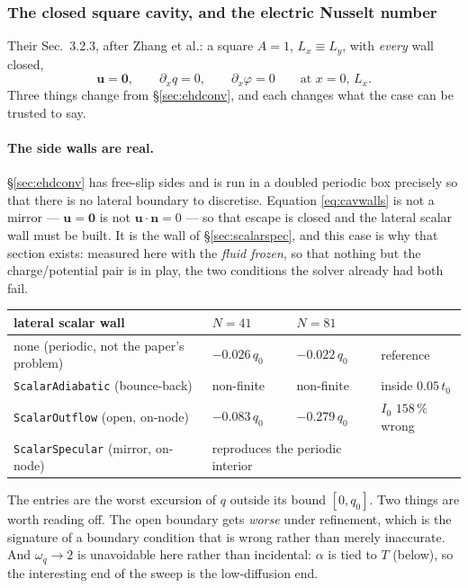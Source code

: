 \documentclass[11pt,a4paper]{article}
\newcommand{\code}[1]{\texttt{\small #1}}
\newcommand{\uu}{\bm{u}}
\newcommand{\nn}{\bm{n}}
\begin{document}
\subsubsection{The closed square cavity, and the electric Nusselt number}
\label{sec:ehdcavity}

Their Sec.~3.2.3, after Zhang et al.: a square $A=1$, $L_x\equiv L_y$, with
\emph{every} wall closed,
\begin{equation}
  \uu = \bm 0,\qquad \partial_x q = 0,\qquad \partial_x\varphi = 0
  \qquad\text{at } x = 0,\,L_x .
  \label{eq:cavwalls}
\end{equation}
Three things change from \S\ref{sec:ehdconv}, and each changes what the case can
be trusted to say.

\paragraph{The side walls are real.} \S\ref{sec:ehdconv} has free-slip sides and
is run in a doubled periodic box precisely so that there is no lateral boundary
to discretise. Equation \eqref{eq:cavwalls} is not a mirror --- $\uu=\bm 0$ is
not $\uu\!\cdot\!\nn=0$ --- so that escape is closed and the lateral scalar wall
must be built. It is the wall of \S\ref{sec:scalarspec}, and this case is why
that section exists: measured here with the \emph{fluid frozen}, so that nothing
but the charge/potential pair is in play, the two conditions the solver already
had both fail.

\begin{center}
\begin{tabular}{llll}
\hline
lateral scalar wall & $N=41$ & $N=81$ & \\
\hline
none (periodic, not the paper's problem) & $-0.026\,q_0$ & $-0.022\,q_0$ & reference \\
\code{ScalarAdiabatic} (bounce-back)     & non-finite    & non-finite    & inside $0.05\,t_0$ \\
\code{ScalarOutflow} (open, on-node)     & $-0.083\,q_0$ & $-0.279\,q_0$ & $I_0$ $158\,\%$ wrong \\
\code{ScalarSpecular} (mirror, on-node)  & \multicolumn{2}{l}{reproduces the periodic interior} & \\
\hline
\end{tabular}
\end{center}

The entries are the worst excursion of $q$ outside its bound $[0,q_0]$. Two
things are worth reading off. The open boundary gets \emph{worse} under
refinement, which is the signature of a boundary condition that is wrong rather
than merely inaccurate. And $\omega_q\to2$ is unavoidable here rather than
incidental: $\alpha$ is tied to $T$ (below), so the interesting end of the sweep
is the low-diffusion end.
\end{document}
